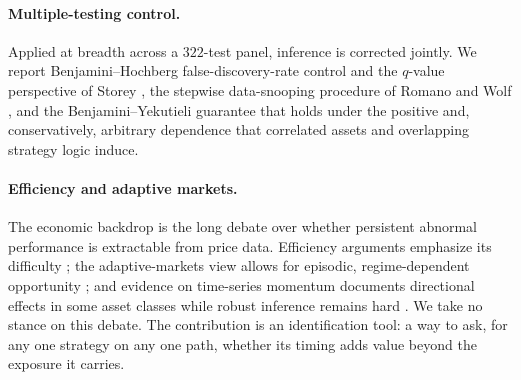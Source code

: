 \paragraph{Multiple-testing control.} Applied at breadth across a $322$-test panel,
inference is corrected jointly. We report Benjamini--Hochberg \cite{benjaminihochberg1995}
false-discovery-rate control and the $q$-value perspective of Storey \cite{Storey2002},
the stepwise data-snooping procedure of Romano and Wolf \cite{romanowolf2005}, and the
Benjamini--Yekutieli \cite{BenjaminiYekutieli2001} guarantee that holds under the positive
and, conservatively, arbitrary dependence that correlated assets and overlapping strategy
logic induce.

\paragraph{Efficiency and adaptive markets.} The economic backdrop is the long debate over
whether persistent abnormal performance is extractable from price data. Efficiency
arguments emphasize its difficulty \cite{fama1970}; the adaptive-markets view allows for
episodic, regime-dependent opportunity \cite{lo2004}; and evidence on time-series momentum
documents directional effects in some asset classes while robust inference remains hard
\cite{moskowitz2012}. We take no stance on this debate. The contribution is an
identification tool: a way to ask, for any one strategy on any one path, whether its timing
adds value beyond the exposure it carries.
